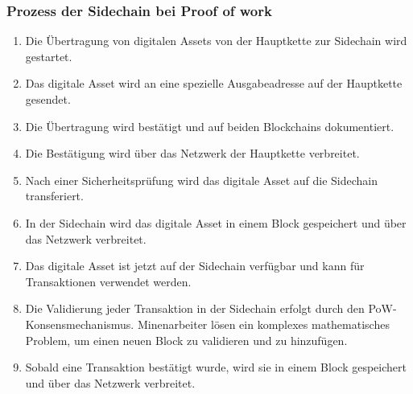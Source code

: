 \subsubsection{Prozess der Sidechain bei Proof of work}

\begin{enumerate}
	\item Die Übertragung von digitalen Assets von der Hauptkette zur Sidechain wird gestartet.
	\item Das digitale Asset wird an eine spezielle Ausgabeadresse auf der Hauptkette gesendet.
	\item Die Übertragung wird bestätigt und auf beiden Blockchains dokumentiert.
	\item Die Bestätigung wird über das Netzwerk der Hauptkette verbreitet.
	\item Nach einer Sicherheitsprüfung wird das digitale Asset auf die Sidechain transferiert.
	\item In der Sidechain wird das digitale Asset in einem Block gespeichert und über das Netzwerk verbreitet.
	\item Das digitale Asset ist jetzt auf der Sidechain verfügbar und kann für Transaktionen verwendet werden.
	\item Die Validierung jeder Transaktion in der Sidechain erfolgt durch den PoW-Konsensmechanismus. Minenarbeiter lösen ein komplexes mathematisches Problem, um einen neuen Block zu validieren und zu hinzufügen.
	\item Sobald eine Transaktion bestätigt wurde, wird sie in einem Block gespeichert und über das Netzwerk verbreitet.
\end{enumerate}

